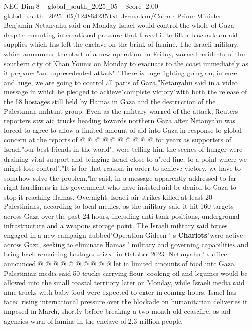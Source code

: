 \begin{textsample}{NEG Dim 8 – global\_south\_2025\_05 – Score -2.00 – global\_south\_2025\_05/124864235.txt}  \label{ex:f8_neg_012}
Jerusalem/Cairo : Prime Minister Benjamin Netanyahu said on Monday Israel would control the whole of Gaza despite mounting international pressure that forced it to lift a blockade on aid supplies which has left the enclave on the brink of famine.
The Israeli military, which announced the start of a new operation on Friday, warned residents of the southern city of Khan Younis on Monday to evacuate to the coast immediately as it prepared"an unprecedented attack"."There is huge fighting going on, intense and huge, we are going to control all parts of Gaza,"Netanyahu said in a video message in which he pledged to achieve"complete victory"with both the release of the 58 hostages still held by Hamas in Gaza and the destruction of the Palestinian militant group.
Even as the military warned of the attack, Reuters reporters saw aid trucks heading towards northern Gaza after Netanyahu was forced to agree to allow a limited amount of aid into Gaza in response to global concern at the reports of @ @ @ @ @ @ @ @ @ @ for years as supporters of Israel,"our best friends in the world", were telling him the scenes of hunger were draining vital support and bringing Israel close to a"red line, to a point where we might lose control"."It is for that reason, in order to achieve victory, we have to somehow solve the problem,"he said, in a message apparently addressed to far-right hardliners in his government who have insisted aid be denied to Gaza to stop it reaching Hamas.
Overnight, Israeli air strikes killed at least 20 Palestinians, according to local medics, as the military said it hit 160 targets across Gaza over the past 24 hours, including anti-tank positions, underground infrastructure and a weapons storage point.
The Israeli military said forces engaged in a new campaign dubbed"Operation Gideon ' s \textbf{Chariots}"were active across Gaza, seeking to eliminate Hamas ' military and governing capabilities and bring back remaining hostages seized in October 2023.
Netanyahu ' s office announced @ @ @ @ @ @ @ @ @ @ let in limited amounts of food into Gaza.
Palestinian media said 50 trucks carrying flour, cooking oil and legumes would be allowed into the small coastal territory later on Monday, while Israeli media said nine trucks with baby food were expected to enter in coming hours.
Israel has faced rising international pressure over the blockade on humanitarian deliveries it imposed in March, shortly before breaking a two-month-old ceasefire, as aid agencies warn of famine in the enclave of 2.3 million people.

\end{textsample}
